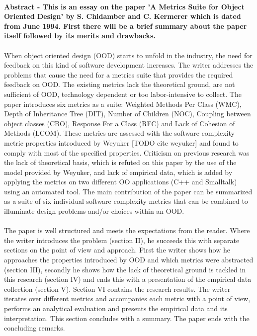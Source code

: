 \paragraph{}
\textbf{
Abstract - This is an essay on the paper 'A Metrics Suite for Object Oriented Design' by S. Chidamber and C.
Kermerer which is dated from June 1994. First there will be a brief summary about the paper itself followed by
its merits and drawbacks.
}

\paragraph{}
When object oriented design (OOD) starts to unfold in the industry, the need for feedback on this kind of software
development increases. The writer addresses the problems that cause the need for a metrics suite that provides the
required feedback on OOD. The existing metrics lack the theoretical ground, are not sufficient of OOD,
technology dependent or too labor-intensive to collect.
The paper introduces six metrics as a suite: Weighted Methods Per Class (WMC), Depth of Inheritance Tree (DIT),
Number of Children (NOC), Coupling between object classes (CBO), Response For a Class (RFC) and Lack of
Cohesion of Methods (LCOM). These metrics are assessed with the software complexity metric properties introduced by
Weyuker [TODO cite weyuker] and found to comply with most of the specified properties.
Criticism on previous research was the lack of theoretical basis, which is refuted on this paper by the use of the
model provided by Weyuker, and lack of empirical data, which is added by applying the metrics on two different OO
applications (C++ and Smalltalk) using an automated tool. The main contribution of the paper can be summarized as a
suite of six individual software complexity metrics that can be combined to illuminate design problems and/or choices
within an OOD.

\paragraph{}
The paper is well structured and meets the expectations from the reader. Where the writer introduces the problem
(section II), he succeeds this with separate sections on the point of view and approach. First the writer shows how he
approaches the properties introduced by OOD and which metrics were abstracted (section III), secondly he shows how the
lack of theoretical ground is tackled in this research (section IV) and ends this with a presentation of the empirical
data collection (section V). Section VI contains the research results. The writer iterates over different metrics and
accompanies each metric with a point of view, performs an analytical evaluation and presents the empirical data and its
interpretation. This section concludes with a summary. The paper ends with the concluding remarks.

